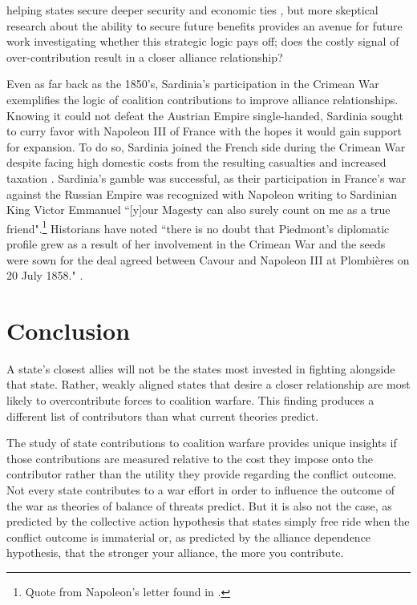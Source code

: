 \documentclass[12pt,letterpaper]{article}
\begin{document}
helping states secure deeper security \citep{whatalliesare_2003} and economic ties \citep{whitmore_uswarallies_2003}, but more skeptical research about the ability to secure future benefits \citep{porter_lastchargeknights_2010} provides an avenue for future work investigating whether this strategic logic pays off; does the costly signal of over-contribution result in a closer alliance relationship?

	Even as far back as the 1850's, Sardinia's participation in the Crimean War exemplifies the logic of coalition contributions to improve alliance relationships. Knowing it could not defeat the Austrian Empire single-handed, Sardinia sought to curry favor with Napoleon III of France with the hopes it would gain support for expansion. To do so, Sardinia joined the French side during the Crimean War despite facing high domestic costs from the resulting casualties and increased taxation \citep[17]{blumberg_carefullyplannedaccident_1990}. Sardinia's gamble was successful, as their participation in France's war against the Russian Empire was recognized with Napoleon writing to Sardinian King Victor Emmanuel ``[y]our Magesty can also surely count on me as a true friend".\footnote{Quote from Napoleon's letter found in \citet[17]{blumberg_carefullyplannedaccident_1990}.} Historians have noted ``there is no doubt that Piedmont's diplomatic profile grew as a result of her involvement in the Crimean War and the seeds were sown for the deal agreed between Cavour and Napoleon III at Plombi\`{e}res on 20 July 1858." \citep{rathbone_piedmont1850s_2008}.

\section{Conclusion}
	A state's closest allies will not be the states most invested in fighting alongside that state. Rather, weakly aligned states that desire a closer relationship are most likely to overcontribute forces to coalition warfare. This finding produces a different list of contributors than what current theories predict.
	
	The study of state contributions to coalition warfare provides unique insights if those contributions are measured relative to the cost they impose onto the contributor rather than the utility they provide regarding the conflict outcome. Not every state contributes to a war effort in order to influence the outcome of the war as theories of balance of threats predict. But it is also not the case, as predicted by the collective action hypothesis that states simply free ride when the conflict outcome is immaterial or, as predicted by the alliance dependence hypothesis, that the stronger your alliance, the more you contribute.
\end{document}
